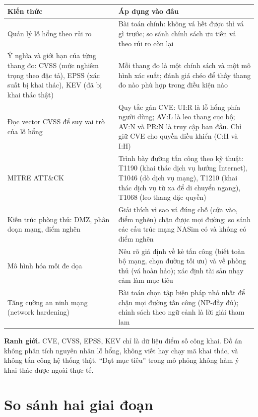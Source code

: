 \documentclass[11pt,a4paper]{article}
\begin{document}
\begin{center}
\begin{tabular}{@{}Y{4.4cm}Y{10.6cm}@{}}
\toprule
Kiến thức & Áp dụng vào đâu \\
\midrule
Quản lý lỗ hổng theo rủi ro & Bài toán chính: không vá hết được thì vá gì trước; so sánh chính sách ưu tiên vá theo rủi ro còn lại \\
Ý nghĩa và giới hạn của từng thang đo: CVSS (mức nghiêm trọng theo đặc tả), EPSS (xác suất bị khai thác), KEV (đã bị khai thác thật) & Mỗi thang đo là một chính sách và một mô hình xác suất; đánh giá chéo để thấy thang đo nào phù hợp trong điều kiện nào \\
Đọc vector CVSS để suy vai trò của lỗ hổng & Quy tắc gán CVE: UI:R là lỗ hổng phía người dùng; AV:L là leo thang cục bộ; AV:N và PR:N là truy cập ban đầu. Chỉ giữ CVE cho quyền điều khiển (C:H và I:H) \\
MITRE ATT\&CK & Trình bày đường tấn công theo kỹ thuật: T1190 (khai thác dịch vụ hướng Internet), T1046 (dò dịch vụ mạng), T1210 (khai thác dịch vụ từ xa để di chuyển ngang), T1068 (leo thang đặc quyền) \\
Kiến trúc phòng thủ: DMZ, phân đoạn mạng, điểm nghẽn & Giải thích vì sao vá đúng chỗ (cửa vào, điểm nghẽn) chặn được mọi đường; so sánh các cấu trúc mạng NASim có và không có điểm nghẽn \\
Mô hình hóa mối đe dọa & Nêu rõ giả định về kẻ tấn công (biết toàn bộ mạng, chọn đường tối ưu) và về phòng thủ (vá hoàn hảo); xác định tài sản nhạy cảm làm mục tiêu \\
Tăng cường an ninh mạng (network hardening) & Bài toán chọn tập biện pháp nhỏ nhất để chặn mọi đường tấn công (NP-đầy đủ); chính sách theo ngữ cảnh là lời giải tham lam \\
\bottomrule
\end{tabular}
\end{center}

\textbf{Ranh giới.} CVE, CVSS, EPSS, KEV chỉ là dữ liệu điểm số công khai. Đồ án không phân tích nguyên nhân lỗ hổng, không viết hay chạy mã khai thác, và không tấn công hệ thống thật. ``Đạt mục tiêu'' trong mô phỏng không hàm ý khai thác được ngoài thực tế.

\section{So sánh hai giai đoạn}
\end{document}
